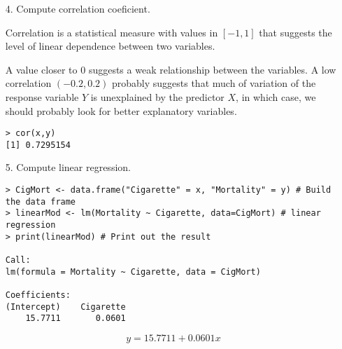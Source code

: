 \begin{frame}[fragile]

\begin{enumerate}
	\item[4.] Compute correlation coeficient. \\[2em]
	\item[]	Correlation is a statistical measure with values in $[-1,1]$ that suggests the level of linear dependence between two variables.\\[2em]
\item[] A value closer to 0 suggests a weak relationship between the variables. A low correlation $(-0.2, 0.2)$ probably suggests that much of variation of the response variable $Y$ is unexplained by the predictor $X$, in which case, we should probably look for better explanatory variables.
\vfill
\begin{center}
\begin{minipage}{0.3\textwidth}
\begin{lstlisting}
> cor(x,y)
[1] 0.7295154
\end{lstlisting}
\end{minipage}
\end{center}
\end{enumerate}
\end{frame}
\begin{frame}[fragile]

	\begin{enumerate}
		\item[5.] Compute linear regression.
			\vfill
		\item[]
	\begin{minipage}{0.9\textwidth}
\begin{lstlisting}
> CigMort <- data.frame("Cigarette" = x, "Mortality" = y) # Build the data frame
> linearMod <- lm(Mortality ~ Cigarette, data=CigMort) # linear regression
> print(linearMod) # Print out the result

Call:
lm(formula = Mortality ~ Cigarette, data = CigMort)

Coefficients:
(Intercept)    Cigarette
    15.7711       0.0601
\end{lstlisting}
	\end{minipage}
	\vfill
\item[]
	\[
	y = 15.7711 + 0.0601 x
	\]
	\end{enumerate}
\end{frame}
